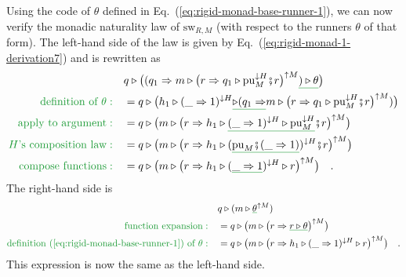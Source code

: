 Using the code of $\theta$ defined in Eq.~(\ref{eq:rigid-monad-base-runner-1}),
we can now verify the monadic naturality law of $\text{sw}_{R,M}$
(with respect to the runners $\theta$ of that form). The left-hand
side of the law is given by Eq.~(\ref{eq:rigid-monad-1-derivation7})
and is rewritten as
\begin{align*}
 & q\triangleright\big((q_{1}\Rightarrow m\triangleright\big(r\Rightarrow q_{1}\triangleright\text{pu}_{M}^{\downarrow H}\bef r\big)^{\uparrow M}\gunderline{)\triangleright\theta}\big)\\
{\color{greenunder}\text{definition of }\theta:}\quad & =q\triangleright\big(h_{1}\triangleright(\_\Rightarrow1)^{\downarrow H}\gunderline{\triangleright(q_{1}\Rightarrow}m\triangleright\big(r\Rightarrow q_{1}\triangleright\text{pu}_{M}^{\downarrow H}\bef r\big)^{\uparrow M})\big)\\
{\color{greenunder}\text{apply to argument}:}\quad & =q\triangleright\big(m\triangleright\big(r\Rightarrow h_{1}\triangleright\gunderline{(\_\Rightarrow1)^{\downarrow H}\triangleright\text{pu}_{M}^{\downarrow H}}\bef r\big)^{\uparrow M}\big)\\
{\color{greenunder}H\text{'s composition law}:}\quad & =q\triangleright\big(m\triangleright\big(r\Rightarrow h_{1}\triangleright(\gunderline{\text{pu}_{M}\bef(\_\Rightarrow1)})^{\downarrow H}\bef r\big)^{\uparrow M}\big)\\
{\color{greenunder}\text{compose functions}:}\quad & =q\triangleright\big(m\triangleright\big(r\Rightarrow h_{1}\triangleright(\gunderline{\_\Rightarrow1})^{\downarrow H}\triangleright r\big)^{\uparrow M}\big)\quad.
\end{align*}
The right-hand side is
\begin{align*}
 & q\triangleright(m\triangleright\gunderline{\theta}^{\uparrow M})\\
{\color{greenunder}\text{function expansion}:}\quad & =q\triangleright\big(m\triangleright\big(r\Rightarrow\gunderline{r\triangleright\theta}\big)^{\uparrow M}\big)\\
{\color{greenunder}\text{definition~(\ref{eq:rigid-monad-base-runner-1}) of }\theta:}\quad & =q\triangleright\big(m\triangleright\big(r\Rightarrow h_{1}\triangleright(\_\Rightarrow1)^{\downarrow H}\triangleright r\big)^{\uparrow M}\big)\quad.
\end{align*}
This expression is now the same as the left-hand side.

